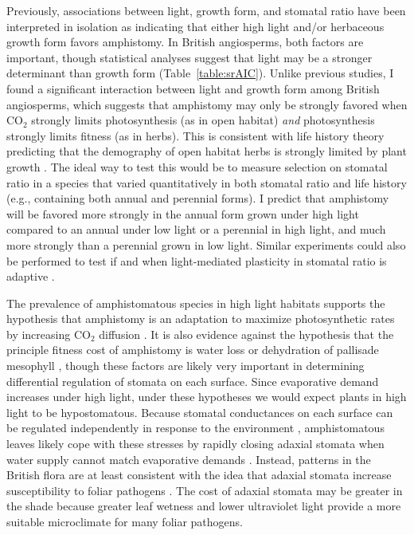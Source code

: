 \documentclass[12pt, oneside]{article}
\begin{document}
Previously, associations between light, growth form, and stomatal ratio have been interpreted in isolation as indicating that either high light and/or herbaceous growth form favors amphistomy. In British angiosperms, both factors are important, though statistical analyses suggest that light may be a stronger determinant than growth form (Table~\ref{table:srAIC}). Unlike previous studies, I found a significant interaction between light and growth form among British angiosperms, which suggests that amphistomy may only be strongly favored when CO$_2$ strongly limits photosynthesis (as in open habitat) \textit{and} photosynthesis strongly limits fitness (as in herbs). This is consistent with life history theory predicting that the demography of open habitat herbs is strongly limited by plant growth \citep{Franco_Silvertown_1996}. The ideal way to test this would be to measure selection on stomatal ratio in a species that varied quantitatively in both stomatal ratio and life history (e.g., containing both annual and perennial forms). I predict that amphistomy will be favored more strongly in the annual form grown under high light compared to an annual under low light or a perennial in high light, and much more strongly than a perennial grown in low light. Similar experiments could also be performed to test if and when light-mediated plasticity in stomatal ratio is adaptive \citep{Gay_Hurd_1975, Mott_Michaelson_1991, Fontana_etal_2017}.

The prevalence of amphistomatous species in high light habitats supports the hypothesis that amphistomy is an adaptation to maximize photosynthetic rates by increasing CO$_2$ diffusion \citep{Jones_1985}. It is also evidence against the hypothesis that the principle fitness cost of amphistomy is water loss \citep{Darwin_1886, Foster_Smith_1986} or dehydration of pallisade mesophyll \citep{Buckley_etal_2015}, though these factors are likely very important in determining differential regulation of stomata on each surface. Since evaporative demand increases under high light, under these hypotheses we would expect plants in high light to be hypostomatous. Because stomatal conductances on each surface can be regulated independently in response to the environment \citep{Darwin_1898, Pospisilova_Solarova_1980, Smith_1981, Reich_1984, Mott_Oleary_1984}, amphistomatous leaves likely cope with these stresses by rapidly closing adaxial stomata when water supply cannot match evaporative demands \citep{Richardson_etal_2017}. Instead, patterns in the British flora are at least consistent with the idea that adaxial stomata increase susceptibility to foliar pathogens \citep{Gutschick_1984b, Mckown_etal_2014}. The cost of adaxial stomata may be greater in the shade because greater leaf wetness and lower ultraviolet light provide a more suitable microclimate for many foliar pathogens.
\end{document}
